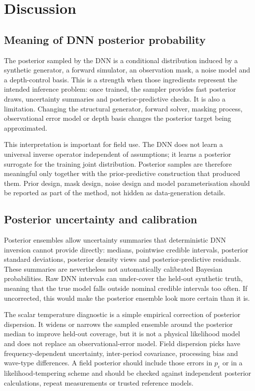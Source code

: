 \documentclass[referee]{gji}
\begin{document}
\clearpage

\section{Discussion}

\subsection{Meaning of DNN posterior probability}

The posterior sampled by the DNN is a conditional distribution induced by a synthetic generator, a forward simulator, an observation mask, a noise model and a depth-control basis. This is a strength when those ingredients represent the intended inference problem: once trained, the sampler provides fast posterior draws, uncertainty summaries and posterior-predictive checks. It is also a limitation. Changing the structural generator, forward solver, masking process, observational error model or depth basis changes the posterior target being approximated.

This interpretation is important for field use. The DNN does not learn a universal inverse operator independent of assumptions; it learns a posterior surrogate for the training joint distribution. Posterior samples are therefore meaningful only together with the prior-predictive construction that produced them. Prior design, mask design, noise design and model parameterisation should be reported as part of the method, not hidden as data-generation details.

\subsection{Posterior uncertainty and calibration}

Posterior ensembles allow uncertainty summaries that deterministic DNN inversion cannot provide directly: medians, pointwise credible intervals, posterior standard deviations, posterior density views and posterior-predictive residuals. These summaries are nevertheless not automatically calibrated Bayesian probabilities. Raw DNN intervals can under-cover the held-out synthetic truth, meaning that the true model falls outside nominal credible intervals too often. If uncorrected, this would make the posterior ensemble look more certain than it is.

The scalar temperature diagnostic is a simple empirical correction of posterior dispersion. It widens or narrows the sampled ensemble around the posterior median to improve held-out coverage, but it is not a physical likelihood model and does not replace an observational-error model. Field dispersion picks have frequency-dependent uncertainty, inter-period covariance, processing bias and wave-type differences. A field posterior should include those errors in $p_\epsilon$ or in a likelihood-tempering scheme and should be checked against independent posterior calculations, repeat measurements or trusted reference models.
\end{document}
